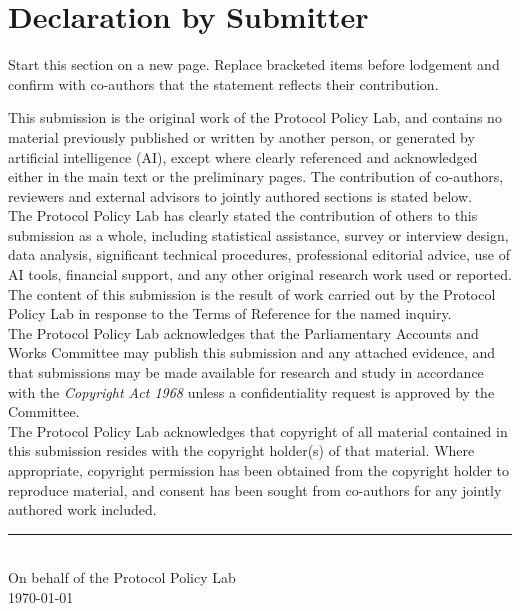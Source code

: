 
\section*{Declaration by Submitter}

\begin{instructional}
Start this section on a new page. Replace bracketed items before lodgement and confirm with co-authors that the statement reflects their contribution.
\end{instructional}

\noindent
This submission is the original work of the Protocol Policy Lab, and contains no material previously published or written by another person, or generated by artificial intelligence (AI), except where clearly referenced and acknowledged either in the main text or the preliminary pages. The contribution of co-authors, reviewers and external advisors to jointly authored sections is stated below.\\

\noindent
The Protocol Policy Lab has clearly stated the contribution of others to this submission as a whole, including statistical assistance, survey or interview design, data analysis, significant technical procedures, professional editorial advice, use of AI tools, financial support, and any other original research work used or reported. The content of this submission is the result of work carried out by the Protocol Policy Lab in response to the Terms of Reference for the named inquiry.\\

\noindent
The Protocol Policy Lab acknowledges that the Parliamentary Accounts and Works Committee may publish this submission and any attached evidence, and that submissions may be made available for research and study in accordance with the \textit{Copyright Act 1968} unless a confidentiality request is approved by the Committee.\\

\noindent
The Protocol Policy Lab acknowledges that copyright of all material contained in this submission resides with the copyright holder(s) of that material. Where appropriate, copyright permission has been obtained from the copyright holder to reproduce material, and consent has been sought from co-authors for any jointly authored work included.\\

\vspace{2em}
\noindent\rule{6cm}{0.4pt}\\
On behalf of the Protocol Policy Lab\\
\today
